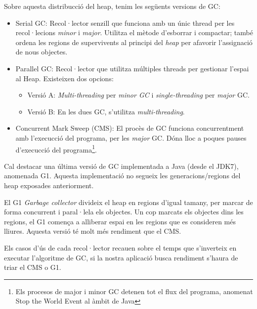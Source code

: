Sobre aquesta distribucció del heap, tenim les següents versions de GC:
\begin{itemize}
    \item Serial GC: Recol·lector senzill que funciona amb un únic thread per les recol·lecions \textit{minor} i \textit{major}. Utilitza el mètode d'esborrar i compactar; també ordena les regions de supervivents al principi del \textit{heap} per afavorir l'assignació de nous objectes.
    \item Parallel GC: Recol·lector que utilitza múltiples threads per gestionar l'espai al Heap. Existeixen dos opcions:
    \begin{itemize}
        \item Versió A: \textit{Multi-threading} per \textit{minor GC} i \textit{single-threading} per \textit{major} GC.
        \item Versió B: En les dues GC, s'utilitza \textit{multi-threading}.
    \end{itemize}
    \item Concurrent Mark Sweep (CMS): El procès de GC funciona concurrentment amb l'execucció del programa, per les \textit{major} GC. Dóna lloc a poques pauses d'execucció del programa\footnote{Els procesos de major i minor GC detenen tot el flux del programa, anomenat Stop the World Event al àmbit de Java}.
\end{itemize}

Cal destacar una última versió de GC implementada a Java (desde el JDK7), anomenada G1. Aquesta implementació no segueix les generacions/regions del heap exposades anteriorment. 

El G1 \textit{Garbage collector} divideix el heap en regions d'igual tamany, per marcar de forma concurrent i paral·lela els objectes. Un cop marcats els objectes dins les regions, el G1 comença a alliberar espai en les regions que es consideren més lliures. Aquesta versió té molt més rendiment que el CMS. 

Els casos d'ús de cada recol·lector recauen sobre el temps que s'inverteix en executar l'algoritme de GC, si la nostra aplicació busca rendiment s'haura de triar el CMS o G1.
